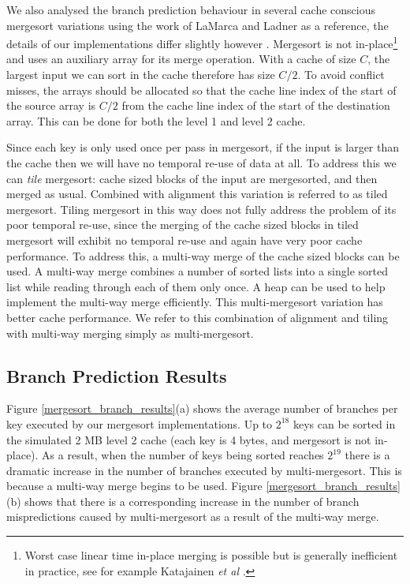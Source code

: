 \documentclass[acmtocl]{acmtrans2m}
\begin{document}
We also analysed the branch prediction behaviour in several cache conscious
mergesort variations using the work of LaMarca and Ladner \citeyear{LaMarca97}
as a reference, the details of our implementations differ slightly however
\cite{BiggarGregg05}.  Mergesort is not in-place\footnote{Worst case linear time
in-place merging is possible but is generally inefficient in practice, see for
example Katajainen \textit{et al} \citeyear{Katajainen+96}.} and uses an
auxiliary array for its merge operation. With a cache of size $C$, the largest
input we can sort in the cache therefore has size $C/2$. To avoid conflict
misses, the arrays should be allocated so that the cache line index of the start
of the source array is $C/2$ from the cache line index of the start of the
destination array.  This can be done for both the level 1 and level 2 cache. 

Since each key is only used once per pass in mergesort, if the input is larger
than the cache then we will have no temporal re-use of data at all. To address
this we can \textit{tile} mergesort: cache sized blocks of the input are
mergesorted, and then merged as usual. Combined with alignment this variation is
referred to as tiled mergesort. Tiling mergesort in this way does not fully
address the problem of its poor temporal re-use, since the merging of the cache
sized blocks in tiled mergesort will exhibit no temporal re-use and again have
very poor cache performance. To address this, a multi-way merge of the cache
sized blocks can be used. A multi-way merge combines a number of sorted lists
into a single sorted list while reading through each of them only once. A heap
can be used to help implement the multi-way merge efficiently.  This
multi-mergesort variation has better cache performance. We refer to this
combination of alignment and tiling with multi-way merging simply as
multi-mergesort.

\subsection{Branch Prediction Results}
\label{mergesort_results_text}

Figure \ref{mergesort_branch_results}(a) shows the average number of branches
per key executed by our mergesort implementations. Up to $2^{18}$ keys can be
sorted in the simulated 2 MB level 2 cache (each key is 4 bytes, and mergesort
is not in-place). As a result, when the number of keys being sorted reaches
$2^{19}$ there is a dramatic increase in the number of branches executed by
multi-mergesort. This is because a multi-way merge begins to be used. Figure
\ref{mergesort_branch_results}(b) shows that there is a corresponding increase
in the number of branch mispredictions caused by multi-mergesort as a result of
the multi-way merge. 
\end{document}
